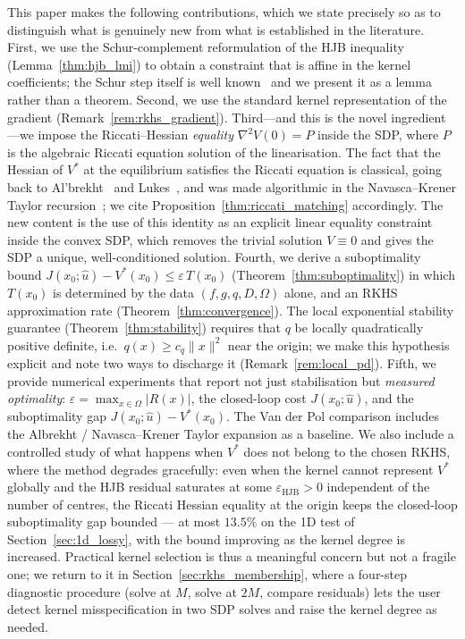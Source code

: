 \documentclass[11pt]{article}
\begin{document}
This paper makes the following contributions, which we state precisely so as to distinguish what is genuinely new from what is established in the literature. First, we use the Schur-complement reformulation of the HJB inequality (Lemma~\ref{thm:hjb_lmi}) to obtain a constraint that is affine in the kernel coefficients; the Schur step itself is well known~\cite{boyd_cvxbook} and we present it as a lemma rather than a theorem. Second, we use the standard kernel representation of the gradient (Remark~\ref{rem:rkhs_gradient}). Third---and this is the novel ingredient---we impose the Riccati--Hessian \emph{equality} $\nabla^2 V(0) = P$ inside the SDP, where $P$ is the algebraic Riccati equation solution of the linearisation. The fact that the Hessian of $V^*$ at the equilibrium satisfies the Riccati equation is classical, going back to Al'brekht~\cite{albrekht_1961} and Lukes~\cite{lukes_1969}, and was made algorithmic in the Navasca--Krener Taylor recursion~\cite{navasca_krener_2000}; we cite Proposition~\ref{thm:riccati_matching} accordingly. The new content is the use of this identity as an explicit linear equality constraint inside the convex SDP, which removes the trivial solution $V\equiv 0$ and gives the SDP a unique, well-conditioned solution. Fourth, we derive a suboptimality bound $J(x_0;\hat u) - V^*(x_0)\le \varepsilon\,T(x_0)$ (Theorem~\ref{thm:suboptimality}) in which $T(x_0)$ is determined by the data $(f,g,q,D,\Omega)$ alone, and an RKHS approximation rate (Theorem~\ref{thm:convergence}). The local exponential stability guarantee (Theorem~\ref{thm:stability}) requires that $q$ be locally quadratically positive definite, i.e.\ $q(x) \geq c_q\|x\|^2$ near the origin; we make this hypothesis explicit and note two ways to discharge it (Remark~\ref{rem:local_pd}). Fifth, we provide numerical experiments that report not just stabilisation but \emph{measured optimality}: $\varepsilon = \max_{x\in\Omega}|R(x)|$, the closed-loop cost $J(x_0;\hat u)$, and the suboptimality gap $J(x_0;\hat u) - V^*(x_0)$. The Van der Pol comparison includes the Albrekht / Navasca--Krener Taylor expansion as a baseline. We also include a controlled study of what happens when $V^*$ does not belong to the chosen RKHS, where the method degrades gracefully: even when the kernel cannot represent $V^*$ globally and the HJB residual saturates at some $\varepsilon_{\mathrm{HJB}} > 0$ independent of the number of centres, the Riccati Hessian equality at the origin keeps the closed-loop suboptimality gap bounded --- at most $13.5\%$ on the 1D test of Section~\ref{sec:1d_lossy}, with the bound improving as the kernel degree is increased. Practical kernel selection is thus a meaningful concern but not a fragile one; we return to it in Section~\ref{sec:rkhs_membership}, where a four-step diagnostic procedure (solve at $M$, solve at $2M$, compare residuals) lets the user detect kernel misspecification in two SDP solves and raise the kernel degree as needed.
\end{document}
